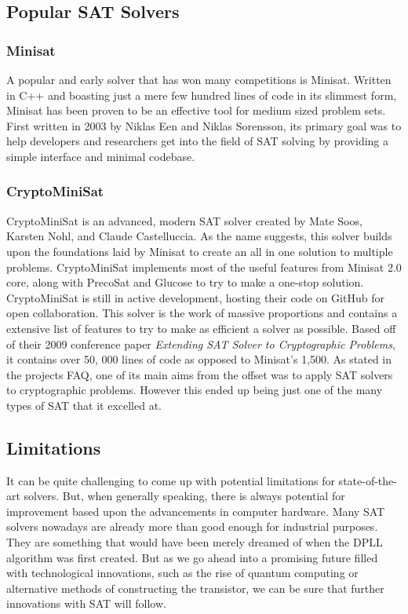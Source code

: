 \documentclass{article}
\begin{document}
\subsection{Popular SAT Solvers}
\subsubsection{Minisat}
A popular and early solver that has won many competitions\cite{minisat} is Minisat. Written in C++ and boasting
just a mere few hundred lines of code in its slimmest form, Minisat has been proven to be an effective tool for medium
sized problem sets. First written in 2003 by Niklas Een and Niklas Sorensson, its primary goal
was to help developers and researchers get into the field of SAT solving by providing a simple
interface and minimal codebase.

\subsubsection{CryptoMiniSat}
CryptoMiniSat is an advanced, modern SAT solver created by Mate Soos, Karsten Nohl, and Claude Castelluccia\cite{cryptominisat}.
As the name suggests, this solver builds upon the foundations laid by Minisat to create an all in one solution to multiple
problems. CryptoMiniSat implements most of the useful features from Minisat 2.0 core, along with PrecoSat and Glucose to try to
make a one-stop solution. CryptoMiniSat is still in active development, hosting their code on GitHub for open collaboration. This
solver is the work of massive proportions and contains a extensive list of features to try to make as efficient a solver as
possible. Based off of their 2009 conference paper \textit{Extending SAT Solver to Cryptographic Problems}, it contains over 50,
000 lines of code as opposed to Minisat's 1,500. As stated in the projects FAQ, one of its main aims from the offset was to apply
SAT solvers to cryptographic problems. However this ended up being just one of the many types of SAT that it excelled at.

\subsection{Limitations}
It can be quite challenging to come up with potential limitations for state-of-the-art solvers. But, when generally speaking,
there is always potential for improvement based upon the advancements in computer hardware. Many SAT solvers nowadays are already
more than good enough for industrial purposes. They are something that would have been merely dreamed of when the DPLL algorithm
was first created. But as we go ahead into a promising future filled with technological innovations, such as the rise of quantum
computing or alternative methods of constructing the transistor, we can be sure that further innovations with SAT will follow.
\end{document}
